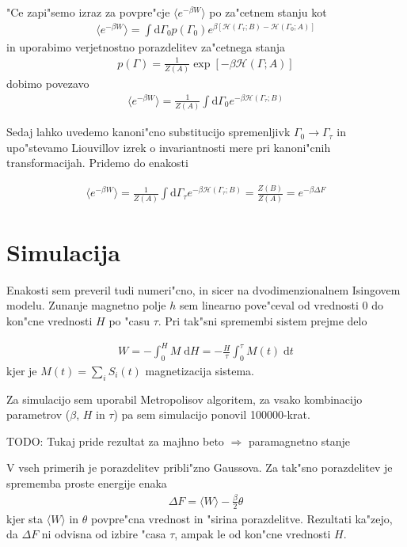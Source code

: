 \documentclass[a4paper,10pt]{article}
\begin{document}
"Ce zapi"semo izraz za povpre"cje $\langle e^{-\beta W}\rangle$ po za"cetnem stanju kot
\begin{align}
 \langle e^{-\beta W}\rangle = \int \mathrm{d}\Gamma_0 p(\Gamma_0) e^{\beta [\mathcal{H}(\Gamma_\tau; B) - \mathcal{H}(\Gamma_0; A)]}
\end{align}
in uporabimo verjetnostno porazdelitev za"cetnega stanja
\begin{align}
 p(\Gamma) = \frac{1}{Z(A)} \exp\left[-\beta \mathcal{H}(\Gamma; A)\right]
\end{align}
dobimo povezavo
\begin{align}
 \langle e^{-\beta W}\rangle = \frac{1}{Z(A)}\int \mathrm{d}\Gamma_0 e^{-\beta\mathcal{H}(\Gamma_\tau; B)} 
\end{align}

Sedaj lahko uvedemo kanoni"cno substitucijo spremenljivk $\Gamma_0 \to \Gamma_\tau$ in upo"stevamo Liouvillov izrek o invariantnosti mere pri kanoni"cnih transformacijah. Pridemo do enakosti

\begin{align}
  \langle e^{-\beta W}\rangle = \frac{1}{Z(A)}\int \mathrm{d}\Gamma_\tau e^{-\beta\mathcal{H}(\Gamma_\tau; B)} = \frac{Z(B)}{Z(A)} = e^{-\beta \Delta F}
\end{align}

\section{Simulacija}

Enakosti sem preveril tudi numeri"cno, in sicer na dvodimenzionalnem Isingovem modelu. Zunanje magnetno polje $h$ sem linearno pove"ceval od vrednosti 0 do kon"cne vrednosti $H$ po "casu $\tau$. Pri tak"sni spremembi sistem prejme delo

\begin{align}
 W = -\int_0^H M \;\mathrm{d}H = -\frac{H}{\tau} \int_0^\tau M(t) \; \mathrm{d}t
\end{align}
kjer je $M(t) = \sum_i S_i(t)$ magnetizacija sistema. 

Za simulacijo sem uporabil Metropolisov algoritem, za vsako kombinacijo parametrov ($\beta$, $H$ in $\tau$) pa sem simulacijo ponovil 100000-krat. 

TODO: Tukaj pride rezultat za majhno beto $\Rightarrow$ paramagnetno stanje

V vseh primerih je porazdelitev pribli"zno Gaussova. Za tak"sno porazdelitev je sprememba proste energije enaka
\begin{align}
 \Delta F = \langle W \rangle - \frac{\beta}{2}\theta
\end{align}
kjer sta $\langle W \rangle$ in $\theta$ povpre"cna vrednost in "sirina porazdelitve. Rezultati ka"zejo, da $\Delta F$ ni odvisna od izbire "casa $\tau$, ampak le od kon"cne vrednosti $H$. 
\end{document}
